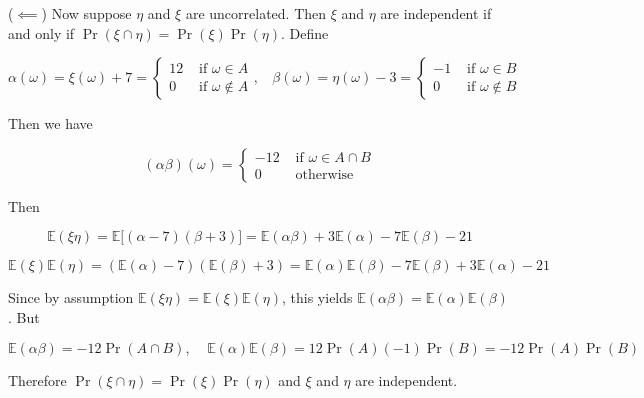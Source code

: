\documentclass{article}
\newcommand{\E}{\mathbb{E}}
\begin{document}
(\(\impliedby\)) Now suppose \(\eta\) and \(\xi\) are uncorrelated. Then \(\xi\) and \(\eta\) are independent if and only if \(\Pr(\xi \cap \eta) = \Pr(\xi) \Pr(\eta)\). Define

\[
\alpha(\omega) =  \xi(\omega) + 7 = \begin{cases} 
      12 & \text{ if } \omega \in A \\
      0 &  \text{ if } \omega \notin A 
   \end{cases}, \ \ \ \ \beta(\omega) =  \eta(\omega) - 3 = \begin{cases} 
      -1 & \text{ if } \omega \in B \\
      0 &  \text{ if } \omega \notin B 
   \end{cases}
\]

Then we have

\[
(\alpha \beta)(\omega) = \begin{cases} 
      -12 & \text{ if } \omega \in A \cap B \\
      0 &  \text{ otherwise} 
   \end{cases}
\]

Then

\[
\E(\xi \eta) = \E\big[ (\alpha - 7)(\beta + 3)\big] = \E(\alpha \beta) + 3 \E(\alpha) - 7 \E(\beta) - 21
\]

\[
\E(\xi) \E(\eta) = (\E(\alpha) - 7) (\E(\beta) + 3) = \E(\alpha) \E(\beta) - 7 \E(\beta) + 3 \E(\alpha) - 21
\]

Since by assumption \( \E(\xi \eta)  = \E(\xi) \E(\eta) \), this yields \(\E(\alpha \beta) = \E(\alpha) \E(\beta) \). But

\[
\E(\alpha \beta) = -12 \Pr(A \cap B), \ \ \ \ \ \E(\alpha) \E(\beta) = 12 \Pr(A) (-1) \Pr(B) = -12\Pr(A)\Pr(B)
\]

Therefore \(\Pr(\xi \cap \eta) = \Pr(\xi) \Pr(\eta)\) and \(\xi\) and \(\eta\) are independent.
\end{document}
